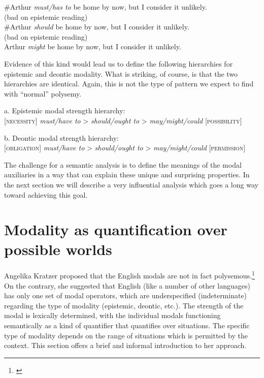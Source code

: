 \ea
\ea \#Arthur \textit{must/has to} be home by now, but I consider it unlikely.\\
  (bad on epistemic reading)\\
\ex \#Arthur \textit{should} be home by now, but I consider it unlikely.\\
  (bad on epistemic reading)\\
\ex Arthur \textit{might} be home by now, but I consider it unlikely.
                       \z
\z


Evidence of this kind would lead us to define the following hierarchies for epistemic and deontic modality. What is striking, of course, is that the two hierarchies are identical. Again, this is not the type of pattern we expect to find with “normal” polysemy.


\ea






 a.  Epistemic modal strength hierarchy:\\
{}[\textsc{necessity}]  \textit{must/have to} > \textit{should/ought to} > \textit{may/might/could}  [\textsc{possibility}]
\z

\ea
  b.  Deontic modal strength hierarchy:\\
{}[\textsc{obligation}]  \textit{must/have to} > \textit{should/ought to} > \textit{may/might/could}  [\textsc{permission}]
\z


The challenge for a semantic analysis is to define the meanings of the modal auxiliaries in a way that can explain these unique and surprising properties. In the next section we will describe a very influential analysis which goes a long way toward achieving this goal.


\section{Modality as quantification over possible worlds}\label{sec:16.3}

Angelika Kratzer proposed that the English modals are not in fact polysemous.\footnote{\citet{Kratzer1981,Kratzer1991}} On the contrary, she suggested that English (like a number of other languages) has only one set of modal operators, which are underspecified (indeterminate) regarding the type of modality (epistemic, deontic, etc.). The strength of the modal is lexically determined, with the individual modals functioning semantically as a kind of quantifier that quantifies over situations. The specific type of modality depends on the range of situations which is permitted by the context. This section offers a brief and informal introduction to her approach.


